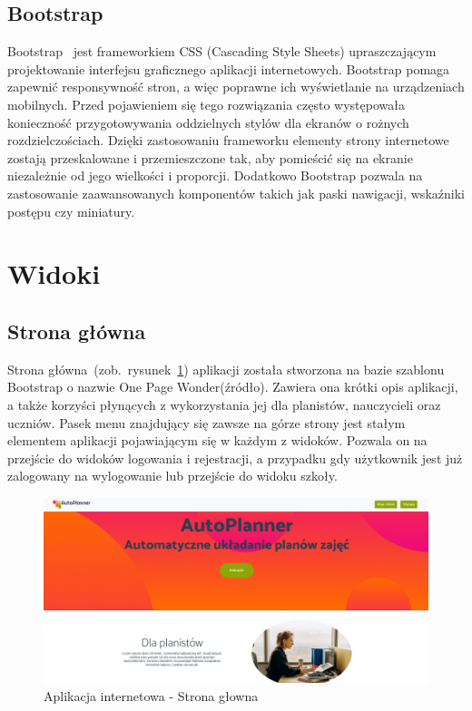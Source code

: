 \subsection{Bootstrap}
Bootstrap~\cite{boot} jest frameworkiem CSS (Cascading Style Sheets) upraszczającym projektowanie interfejsu graficznego aplikacji internetowych. Bootstrap pomaga zapewnić responsywność stron, a więc poprawne ich wyświetlanie na urządzeniach mobilnych. Przed pojawieniem się tego rozwiązania często występowała konieczność przygotowywania oddzielnych stylów dla ekranów o rożnych rozdzielczościach. Dzięki zastosowaniu frameworku elementy strony internetowe zostają przeskalowane i przemieszczone tak, aby pomieścić się na ekranie niezależnie od jego wielkości i proporcji. Dodatkowo Bootstrap pozwala na zastosowanie zaawansowanych komponentów takich jak paski nawigacji, wskaźniki postępu czy miniatury. 

\clearpage
\section{Widoki}
\subsection{Strona główna}
Strona główna~(zob.~rysunek~\ref{rys:main}) aplikacji została stworzona na bazie szablonu Bootstrap o nazwie One Page Wonder(źródło). Zawiera ona krótki opis aplikacji, a także korzyści płynących z wykorzystania jej dla planistów, nauczycieli oraz uczniów. Pasek menu znajdujący się zawsze na górze strony jest stałym elementem aplikacji pojawiającym się w każdym z widoków. Pozwala on na przejście do widoków logowania i rejestracji, a przypadku gdy użytkownik jest już zalogowany na wylogowanie lub przejście do widoku szkoły. 
\begin{figure}[!ht]
\centering\includegraphics[width=\textwidth]{figures/main}
\caption{Aplikacja internetowa - Strona głowna}\label{rys:main}
\end{figure}
